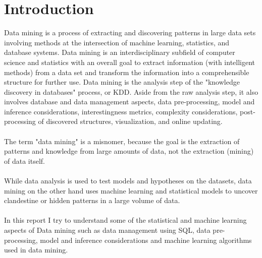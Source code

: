 \section*{Introduction}

Data mining is a process of extracting and discovering patterns in large data sets involving methods at the intersection of machine learning, statistics, and database systems. Data mining is an interdisciplinary subfield of computer science and statistics with an overall goal to extract information (with intelligent methods) from a data set and transform the information into a comprehensible structure for further use. Data mining is the analysis step of the "knowledge discovery in databases" process, or KDD. Aside from the raw analysis step, it also involves database and data management aspects, data pre-processing, model and inference considerations, interestingness metrics, complexity considerations, post-processing of discovered structures, visualization, and online updating.\\
\\
The term "data mining" is a misnomer, because the goal is the extraction of patterns and knowledge from large amounts of data, not the extraction (mining) of data itself.\\
\\
While data analysis is used to test models and hypotheses on the datasets, data mining on the other hand uses machine learning and statistical models to uncover clandestine or hidden patterns in a large volume of data.\\
\\
In this report I try to understand some of the statistical and machine learning aspects of Data mining such as data management using SQL, data pre{-}processing, model and inference considerations and machine learning algorithms used in data mining.